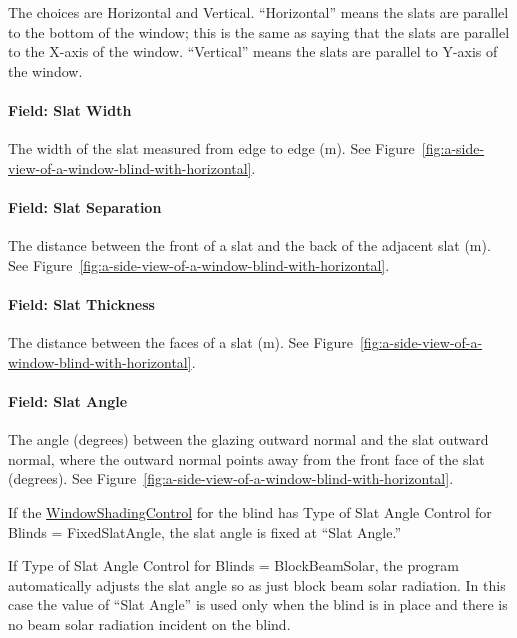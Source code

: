The choices are Horizontal and Vertical. ``Horizontal'' means the slats are parallel to the bottom of the window; this is the same as saying that the slats are parallel to the X-axis of the window. ``Vertical'' means the slats are parallel to Y-axis of the window.

\paragraph{Field: Slat Width}\label{field-slat-width}

The width of the slat measured from edge to edge (m). See Figure~\ref{fig:a-side-view-of-a-window-blind-with-horizontal}.

\paragraph{Field: Slat Separation}\label{field-slat-separation}

The distance between the front of a slat and the back of the adjacent slat (m). See Figure~\ref{fig:a-side-view-of-a-window-blind-with-horizontal}.

\paragraph{Field: Slat Thickness}\label{field-slat-thickness}

The distance between the faces of a slat (m). See Figure~\ref{fig:a-side-view-of-a-window-blind-with-horizontal}.

\paragraph{Field: Slat Angle}\label{field-slat-angle}

The angle (degrees) between the glazing outward normal and the slat outward normal, where the outward normal points away from the front face of the slat (degrees). See Figure~\ref{fig:a-side-view-of-a-window-blind-with-horizontal}.

If the \hyperref[windowpropertyshadingcontrol]{WindowShadingControl} for the blind has Type of Slat Angle Control for Blinds = FixedSlatAngle, the slat angle is fixed at ``Slat Angle.''

If Type of Slat Angle Control for Blinds = BlockBeamSolar, the program automatically adjusts the slat angle so as just block beam solar radiation. In this case the value of ``Slat Angle'' is used only when the blind is in place and there is no beam solar radiation incident on the blind.

